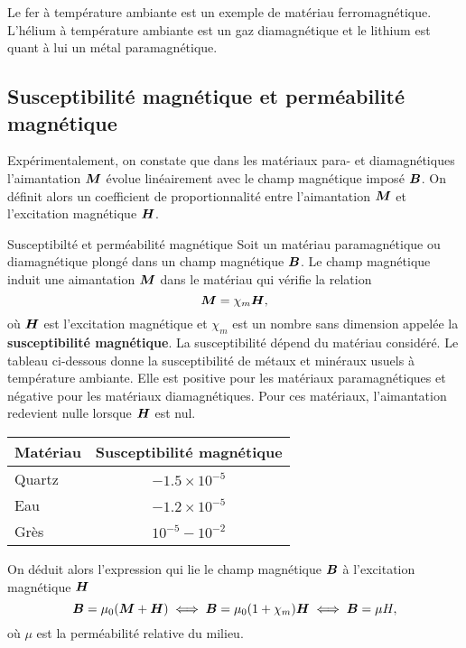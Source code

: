 \begin{exemple}
	Le fer à température ambiante est un exemple de matériau ferromagnétique.
	L'hélium à température ambiante est un gaz diamagnétique et le lithium est
	quant à lui un métal paramagnétique.
\end{exemple}

\subsection{Susceptibilité magnétique et perméabilité magnétique}
Expérimentalement, on constate que dans les matériaux para- et diamagnétiques
l'aimantation $\vecM$ évolue linéairement avec le champ magnétique imposé
$\vecb$. On définit alors un coefficient de proportionnalité entre l'aimantation
$\vecM$ et l'excitation magnétique $\vecH$.

\begin{defn}{Susceptibilté et perméabilité magnétique}
	Soit un matériau paramagnétique ou diamagnétique plongé dans un champ magnétique
	$\vecb$. Le champ magnétique induit une aimantation $\vecM$ dans le matériau
	qui vérifie la relation
	\begin{equation}
		\vecM = \chi_m \vecH,
	\end{equation}
	où $\vecH$ est l'excitation magnétique et $\chi_m$ est un nombre sans
	dimension appelée la \textbf{susceptibilité magnétique}. La susceptibilité
	dépend du matériau considéré. Le tableau ci-dessous
	donne la susceptibilité de métaux et minéraux usuels à température ambiante. 
	Elle est positive pour les matériaux paramagnétiques et négative
	pour les matériaux diamagnétiques. Pour ces matériaux, l'aimantation
	redevient nulle lorsque $\vecH$ est nul.

	\begin{center}
	\begin{tabular}{l|c}
		\textbf{Matériau} & \textbf{Susceptibilité magnétique}  \\\hline
		Quartz 	 & $-1.5 \times 10^{-5}$ \\[0.5em]
		Eau 	 & $-1.2 \times 10^{-5}$ \\[0.5em]
		Grès     & $10^{-5} - 10^{-2}$\\[0.5em]
	\end{tabular}
	\end{center}

	On déduit alors l'expression qui lie le champ magnétique $\vecb$ à
	l'excitation magnétique $\vecH$
	\begin{equation}
		\vecb = \mu_0(\vecM + \vecH) \iff \vecb = \mu_0 (1 + \chi_m)
		\vecH \iff \vecb = \mu H,
	\end{equation}
	où $\mu$ est la perméabilité relative du milieu.
\end{defn}

